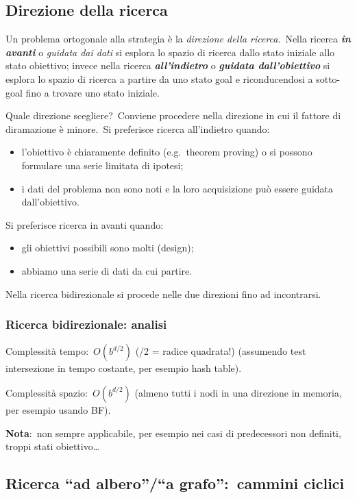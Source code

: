 \subsection{Direzione della ricerca}

Un problema ortogonale alla strategia è la \textit{direzione della ricerca}.\
Nella ricerca \textbf{\textit{in avanti}} o \textit{guidata dai dati} si esplora lo spazio di ricerca dallo stato iniziale allo stato obiettivo; invece nella ricerca \textbf{\textit{all'indietro}} o \textbf{\textit{guidata dall'obiettivo}} si esplora lo spazio di ricerca a partire da uno stato goal e riconducendosi a sotto-goal fino a trovare uno stato iniziale.

Quale direzione scegliere?\ Conviene procedere nella direzione in cui il fattore di diramazione è minore.\ Si preferisce ricerca all'indietro quando:
\begin{itemize}
	\item l'obiettivo è chiaramente definito (e.g.\ theorem proving) o si possono formulare una serie limitata di ipotesi;
	\item i dati del problema non sono noti e la loro acquisizione può essere guidata dall'obiettivo.
\end{itemize}
Si preferisce ricerca in avanti quando:
\begin{itemize}
	\item gli obiettivi possibili sono molti (design);
	\item abbiamo una serie di dati da cui partire.
\end{itemize}
Nella ricerca bidirezionale si procede nelle due direzioni fino ad incontrarsi.\

\subsubsection{Ricerca bidirezionale: analisi}

Complessità tempo:\ $O(b^{d/2})$ (\slash2 = radice quadrata!)
(assumendo test intersezione in tempo costante, per esempio hash table).

\noindent Complessità spazio:\ $O(b^{d/2})$ (almeno tutti i nodi in una direzione in memoria, per esempio usando BF).

\textbf{Nota}:\ non sempre applicabile, per esempio nei casi di predecessori non definiti, troppi stati obiettivo\dots

\subsection{Ricerca ``ad albero''\slash``a grafo'':\ cammini ciclici}

